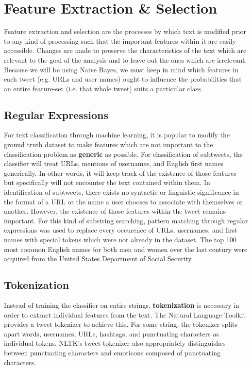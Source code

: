 \documentclass[11pt, twoside, reqno]{book}
\begin{document}
\section{Feature Extraction \& Selection}
\label{feature_extraction}

Feature extraction and selection are the processes by which text is modified prior to any kind of processing such that the important features within it are easily accessible. Changes are made to preserve the characteristics of the text which are relevant to the goal of the analysis and to leave out the ones which are irrelevant. Because we will be using Naive Bayes, we must keep in mind which features in each tweet (e.g. URLs and user names) ought to influence the probabilities that an entire feature-set (i.e. that whole tweet) suits a particular class.

\subsection{Regular Expressions}
\label{regular_expressions}

For text classification through machine learning, it is popular to modify the ground truth dataset to make features which are not important to the classification problem as \textbf{generic} as possible. For classification of subtweets, the classifier will treat URLs, mentions of usernames, and English first names generically. In other words, it will keep track of the existence of those features but specifically will not encounter the text contained within them. In identification of subtweets, there exists no syntactic or linguistic significance in the format of a URL or the name a user chooses to associate with themselves or another. However, the existence of those features within the tweet remains important. For this kind of substring searching, pattern matching through regular expressions was used to replace every occurence of URLs, usernames, and first names with special tokens which were not already in the dataset. The top 100 most common English names for both men and women over the last century were acquired from the United States Department of Social Security.

\subsection{Tokenization}
\label{tokenization}

Instead of training the classifier on entire strings, \textbf{tokenization} is necessary in order to extract individual features from the text. The Natural Language Toolkit \cite{nltk} provides a tweet tokenizer to achieve this. For some string, the tokenizer splits apart words, usernames, URLs, hashtags, and punctuating characters as individual tokens. NLTK's tweet tokenizer also appropriately distinguishes between punctuating characters and emoticons composed of punctuating characters.
\end{document}

